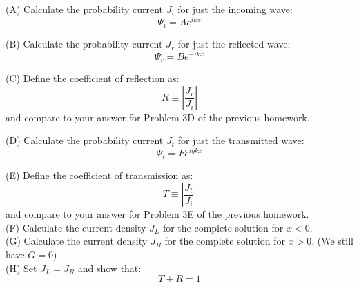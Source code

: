 \documentclass[12pt]{article}
\begin{document}
\noindent
(A) Calculate the probability current $J_i$ for just the incoming wave:
$$\Psi_i = A e^{ikx}$$

\noindent
(B) Calculate the probability current $J_r$ for just the reflected wave:
$$\Psi_r = B e^{-ikx}$$

\noindent
(C) Define the coefficient of reflection as:
$$R \equiv \left\lvert \frac{J_r}{J_i} \right\rvert $$
and compare to your answer for Problem 3D of the previous homework.

\noindent
(D) Calculate the probability current $J_t$ for just the transmitted wave:
$$\Psi_t = F e^{i\eta kx}$$

\noindent
(E) Define the coefficient of transmission as:
$$T \equiv \left\lvert  \frac{J_t}{J_i} \right\rvert $$
and compare to your answer for Problem 3E of the previous homework.\\[5pt]

\noindent
(F) Calculate the current density $J_L$ for the complete solution for $x<0$.\\[5pt]

\noindent
(G) Calculate the current density $J_R$ for the complete solution for $x>0$. (We still have $G=0$)\\[5pt]

\noindent
(H) Set $J_L = J_R$ and show that:
$$T + R = 1$$
\end{document}
